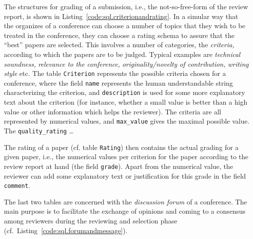 The structures for grading of a submission, i.e., the not-so-free-form of
the review report, is shown in Listing~\ref{code:sql.criterionandrating}.
In a simular way that the organizes of a conference can choose a number of
topics that they wish to be treated in the conference, they can choose a
rating schema to assure that the ``best'' papers are selected.
%
This involves a number of categories, the \emph{criteria,} according to
which the papers are to be judged. Typical examples are \emph{technical
  soundness,} \emph{relevance to the conference,} \emph{originality/novelty
  of contribution,} \emph{writing style} etc. The table \texttt{Criterion}
represents the possible criteria chosen for a conference, where the field
\texttt{name} represents the human understandable string characterizing the
criterion, and \texttt{description} is used for some more explanatory text
about the criterion (for instance, whether a small value is better than a
high value or other information which helps the reviewer). The criteria are
all represented by numerical values, and \texttt{max\_value} gives the
maximal possible value. The \texttt{quality\_rating} \ldots

The rating of a paper (cf. table \texttt{Rating}) then contains the actual
grading for a given paper, i.e., the numerical values per criterion for the
paper according to the review report at hand (the field \texttt{grade}).
Apart from the numerical value, the reviewer can add some explanatory text
or justification for this grade in the field \texttt{comment}.


%


\medskip

The last two tables are concerned with the \emph{discussion forum} of a
conference. The main purpose is to facilitate the exchange of opinions and
coming to a consensus among reviewers during the reviewing and selection
phase (cf.\ Listing~\ref{code:sql.forumandmessage}).

%


%

%



%

